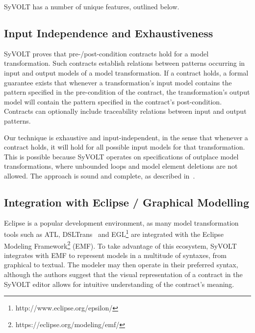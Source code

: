 SyVOLT has a number of unique features, outlined below.

\subsection{Input Independence and Exhaustiveness} 

SyVOLT proves that pre-/post-condition contracts hold for a model transformation.
Such contracts establish relations between patterns occurring in input and output
models of a model transformation. If a contract holds, a formal guarantee
exists that whenever a transformation's input model contains the pattern
specified in the pre-condition of the contract, the transformation's output model will contain
the pattern specified in the contract's post-condition. Contracts can 
optionally include traceability relations between input and output patterns. 

Our technique is exhaustive and input-independent, in the sense that whenever a contract holds, it
will hold for all possible input models for that transformation. This is possible
because SyVOLT operates on specifications of outplace model transformations,
where unbounded loops and model element deletions are not allowed. The approach is sound and complete, as described
in~\cite{Lucio2014}.




\subsection{Integration with Eclipse / Graphical Modelling}

Eclipse is a popular development environment, as many model transformation tools
such as ATL, DSLTrans~\cite{Barroca2011} and
EGL\footnote{http://www.eclipse.org/epsilon/} are integrated with the Eclipse
Modeling Framework\footnote{https://eclipse.org/modeling/emf/} (EMF). To take
advantage of this ecosystem, SyVOLT integrates with EMF to represent models in a
multitude of syntaxes, from graphical to textual. The modeler may then operate
in their preferred syntax, although the authors suggest that the visual
representation of a contract in the SyVOLT editor allows for intuitive
understanding of the contract's meaning.




